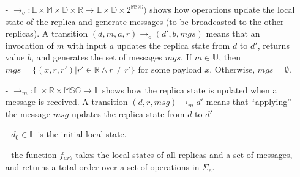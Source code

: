 \begin{itemize}
\setlength{\itemsep}{0.5pt}
\item[-] $\rightarrow_o: \mathbb{L} \times \mathbb{M} \times \mathbb{D} \times \mathbb{R} \rightarrow \mathbb{L} \times \mathbb{D} \times 2^{\mathbb{MSG}})$ shows how operations update the local state of the replica and generate messages (to be broadcasted to the other replicas). A transition $(d,m,a,r) \rightarrow_o (d',b,\mathit{mgs})$ means that an invocation of $m$ with input $a$ updates the replica state from $d$ to $d'$, returns value $b$, and generates the set of messages $\mathit{mgs}$.
If $m \in \mathbb{U}$, then $\mathit{mgs} = \{ (x,r,r') \vert r' \in \mathbb{R} \wedge r \neq r' \}$ for some payload $x$. Otherwise, $\mathit{mgs} = \emptyset$.

\item[-] $\rightarrow_m: \mathbb{L} \times \mathbb{R} \times \mathbb{MSG} \rightarrow \mathbb{L}$ shows how the replica state is updated when a message is received. A transition $(d,r,\mathit{msg}) \rightarrow_m d'$ means that ``applying'' the message $\mathit{msg}$ updates the replica state from $d$ to $d'$

\item[-] $d_0 \in \mathbb{L}$ is the initial local state.

\item[-] the function $f_{\mathit{arb}}$ takes the local states of all replicas and a set of messages, and returns a total order over a set of operations in $\Sigma_e$. %
%
%
%
\end{itemize}


